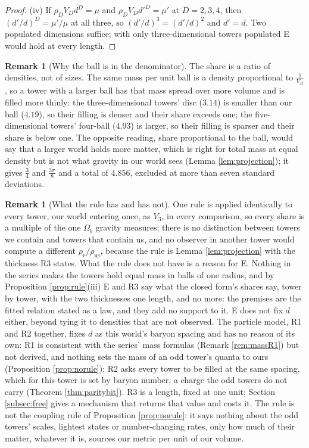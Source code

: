 \documentclass[11pt]{article}
\theoremstyle{definition}
\newtheorem{remark}[theorem]{Remark}
\begin{document}
\begin{proof}
(iv) If $\rho_{D}V_{D}d^{D} = \mu$ and $\rho_{D}V_{D}d'^{D} = \mu'$ at $D = 2, 3, 4$, then $(d'/d)^{D} = \mu'/\mu$ at all three, so $(d'/d)^{3} = (d'/d)^{2}$ and $d' = d$. Two populated dimensions suffice; with only three-dimensional towers populated E would hold at every length.
\end{proof}

\begin{remark}[Why the ball is in the denominator]\label{rem:denominator}
The share is a ratio of densities, not of sizes. The same mass per unit ball is a density proportional to $\tfrac{1}{V_{D}}$, so a tower with a larger ball has that mass spread over more volume and is filled more thinly: the three-dimensional towers' disc ($3.14$) is smaller than our ball ($4.19$), so their filling is denser and their share exceeds one; the five-dimensional towers' four-ball ($4.93$) is larger, so their filling is sparser and their share is below one. The opposite reading, share proportional to the ball, would say that a larger world holds more matter, which is right for total mass at equal density but is not what gravity in our world sees (Lemma \ref{lem:projection}); it gives $\tfrac{3}{4}$ and $\tfrac{3\pi}{8}$ and a total of $4.856$, excluded at more than seven standard deviations.
\end{remark}

\begin{remark}[What the rule has and has not]\label{rem:rulehas}
One rule is applied identically to every tower, our world entering once, as $V_{3}$, in every comparison, so every share is a multiple of the one $\Omega_{b}$ gravity measures; there is no distinction between towers we contain and towers that contain us, and no observer in another tower would compute a different $\rho_{r}/\rho_{\mathrm{us}}$, because the rule is Lemma \ref{lem:projection} with the thickness R3 states. What the rule does not have is a reason for E. Nothing in the series makes the towers hold equal mass in balls of one radius, and by Proposition \ref{prop:rule}(iii) E and R3 say what the closed form's shares say, tower by tower, with the two thicknesses one length, and no more: the premises are the fitted relation stated as a law, and they add no support to it. E does not fix $d$ either, beyond tying it to densities that are not observed. The particle model, R1 and R2 together, fixes $d$ as this world's baryon spacing and has no reason of its own: R1 is consistent with the series' mass formulas (Remark \ref{rem:massR1}) but not derived, and nothing sets the mass of an odd tower's quanta to ours (Proposition \ref{prop:norule}); R2 asks every tower to be filled at the same spacing, which for this tower is set by baryon number, a charge the odd towers do not carry (Theorem \ref{thm:paritybit}). R3 is a length, fixed at one unit; Section \ref{subsec:free} gives a mechanism that returns that value and costs it. The rule is not the coupling rule of Proposition \ref{prop:norule}: it says nothing about the odd towers' scales, lightest states or number-changing rates, only how much of their matter, whatever it is, sources our metric per unit of our volume.
\end{remark}
\end{document}
